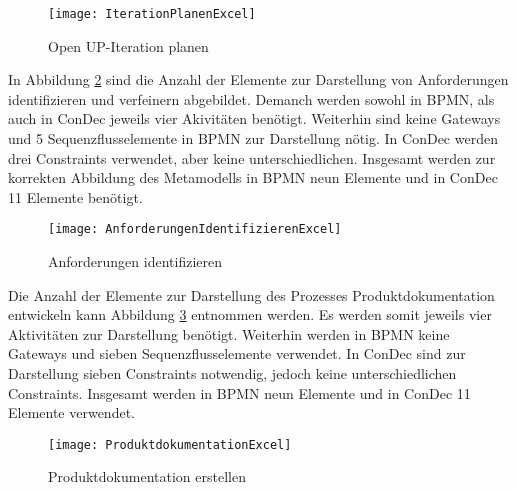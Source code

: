 \begin{figure}[htp]
\begin{center}
  \texttt{[image: IterationPlanenExcel]} %
  \caption{Open UP-Iteration planen}
  \label{fig:IterationPlanenExcel}
\end{center}
\end{figure}

In Abbildung \ref{fig:AnforderungenIdentifizierenExcel} sind die Anzahl der Elemente zur Darstellung von Anforderungen identifizieren und verfeinern abgebildet. Demanch werden sowohl in BPMN, als auch in ConDec jeweils vier Akivitäten benötigt. Weiterhin sind keine Gateways und 5 Sequenzflusselemente in BPMN zur Darstellung nötig. In ConDec werden drei Constraints verwendet, aber keine unterschiedlichen. Insgesamt werden zur korrekten Abbildung des Metamodells in BPMN neun Elemente und in ConDec 11 Elemente benötigt.\newline

\begin{figure}[htp]
\begin{center}
  \texttt{[image: AnforderungenIdentifizierenExcel]} %
  \caption{Anforderungen identifizieren}
  \label{fig:AnforderungenIdentifizierenExcel}
\end{center}
\end{figure}

Die Anzahl der Elemente zur Darstellung des Prozesses Produktdokumentation entwickeln kann Abbildung \ref{fig:ProduktdokumentationExcel} entnommen werden. Es werden somit jeweils vier Aktivitäten zur Darstellung benötigt. Weiterhin werden in BPMN keine Gateways und sieben Sequenzflusselemente verwendet. In ConDec sind zur Darstellung sieben Constraints notwendig, jedoch keine unterschiedlichen Constraints. Insgesamt werden in BPMN neun Elemente und in ConDec 11 Elemente verwendet.\newline

\begin{figure}[htp]
\begin{center}
  \texttt{[image: ProduktdokumentationExcel]} %
  \caption{Produktdokumentation erstellen}
  \label{fig:ProduktdokumentationExcel}
\end{center}
\end{figure}

